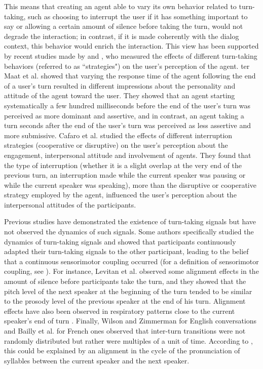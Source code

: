 \documentclass[twocolumn]{svjour3}
\begin{document}
This means that creating an agent able to vary its own behavior related to turn-taking, such as choosing to interrupt the user if it has something important to say
or allowing a certain amount of silence before
taking the turn, would not degrade the interaction; in contrast,
if it is made coherently with the dialog context, this behavior would enrich the interaction. This view has been
supported by recent studies made by \citep{ter_maat_how_2010} and \citep{cafaro_effects_2016}, who measured
the effects of different turn-taking behaviors (referred to as ``strategies") on
the user's perception of the agent.
ter Maat et al.\citep{ter_maat_how_2010} showed that varying the response time of the agent following the end of a user's turn resulted in different impressions about the personality and attitude of the agent toward the user. They showed that an agent starting systematically a few hundred milliseconds before the end of the user's turn was perceived as more dominant and assertive, and in contrast, an agent taking a turn seconds after the end of the user's turn was perceived as less assertive and more submissive.  
Cafaro et al.\citep{cafaro_effects_2016} studied the effects of different interruption strategies (cooperative or disruptive) on the user's
perception about the engagement, interpersonal attitude
and involvement of agents. They found that the type of interruption (whether it is a slight overlap at the very end of the previous turn, an interruption made while the current speaker was pausing or while the current speaker was speaking), more than
the disruptive or cooperative strategy employed by the
agent, influenced the user's perception about the interpersonal
attitudes of the participants.
 
Previous studies have demonstrated the existence of turn-taking signals but have not observed the dynamics of such signals.
Some authors specifically studied the dynamics of turn-taking signals and showed that participants continuously adapted their turn-taking signals to the other participant, leading to the belief that a continuous sensorimotor coupling occurred (for a definition of sensorimotor coupling, see \citep{warren_dynamics_2006}).
For instance,  Levitan et al. \citep{levitan_entrainment_2015} observed some
alignment effects in the amount of silence before participants
take the turn, and they showed that the pitch level of
the next speaker at the beginning of the turn tended to
be similar to the prosody level of the previous speaker
at the end of his turn. 
Alignment effects have also been observed in respiratory patterns close to the current speaker's end of turn \citep{mcfarland_respiratory_2001}.
Finally, Wilson and Zimmerman \citep{wilson_structure_1986} for English conversations and Bailly et al. \citep{bailly_pauses_2012} for French ones observed that inter-turn transitions were not randomly distributed but rather were multiples of a unit of time. According to \citep{wilson_oscillator_2005}, this could be explained by an alignment in the cycle of the pronunciation of syllables between the current speaker and the next speaker.
\end{document}

